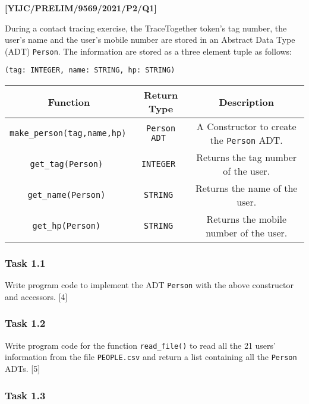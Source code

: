 \item \textbf{{[}YIJC/PRELIM/9569/2021/P2/Q1{]} }

During a contact tracing exercise, the TraceTogether token\textquoteright s
tag number, the user\textquoteright s name and the user\textquoteright s
mobile number are stored in an Abstract Data Type (ADT) \texttt{Person}.
The information are stored as a three element tuple as follows: 
\noindent \begin{center}
\texttt{(tag: INTEGER, name: STRING, hp: STRING) }
\par\end{center}

\noindent \begin{center}
\begin{tabular}{|c|c|c|}
\hline 
\textbf{Function } & \textbf{Return Type } & \textbf{Description}\tabularnewline
\hline 
\texttt{make\_person(tag,name,hp) } & \texttt{Person ADT } & A Constructor to create the \texttt{Person} ADT.\tabularnewline
\hline 
\texttt{get\_tag(Person) } & \texttt{INTEGER } & Returns the tag number of the user. \tabularnewline
\hline 
\texttt{get\_name(Person) } & \texttt{STRING } & Returns the name of the user.\tabularnewline
\hline 
\texttt{get\_hp(Person) } & \texttt{STRING } & Returns the mobile number of the user.\tabularnewline
\hline 
\end{tabular}
\par\end{center}

\subsubsection*{Task 1.1 }

Write program code to implement the ADT \texttt{Person} with the above
constructor and accessors.\hfill{} {[}4{]}

\subsubsection*{Task 1.2 }

Write program code for the function \texttt{read\_file()} to read
all the 21 users\textquoteright{} information from the file \texttt{PEOPLE.csv}
and return a list containing all the \texttt{Person} ADTs.\hfill{}
{[}5{]}

\subsubsection*{Task 1.3 }

